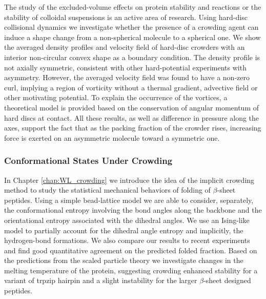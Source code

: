 The study of the excluded-volume effects on protein stability and reactions or the stability of colloidal suspensions is an active area of research. Using hard-disc collisional dynamics we investigate whether the presence of a crowding agent can induce a shape change from a non-spherical molecule to a spherical one. We show the averaged density profiles and velocity field of hard-disc crowders with an interior non-circular convex shape as a boundary condition. The density profile is not axially symmetric, consistent with other hard-potential experiments with asymmetry. However, the averaged velocity field was found to have a non-zero curl, implying a region of vorticity without a thermal gradient, advective field or other motivating potential. To explain the occurrence of the vortices, a theoretical model is provided based on the conservation of angular momentum of hard discs at contact. All these results, as well as difference in pressure along the axes, support the fact that as the packing fraction of the crowder rises, increasing force is exerted on an asymmetric molecule toward a symmetric one.

\subsubsection{Conformational States Under Crowding}
In Chapter \ref{chap:WL_crowding} we introduce the idea of the implicit crowding method to study the statistical mechanical behaviors of folding of $\beta$-sheet peptides. Using a simple bead-lattice model we are able to consider, separately, the conformational entropy involving the bond angles along the backbone and the orientational entropy associated with the dihedral angles. We use an Ising-like model to partially account for the dihedral angle entropy and implicitly, the hydrogen-bond formations. We also compare our results to recent experiments and find good quantitative agreement on the predicted folded fraction. Based on the predictions from the scaled particle theory we investigate changes in the melting temperature of the protein, suggesting crowding enhanced stability for a variant of trpzip hairpin and a slight instability for the larger $\beta$-sheet designed peptides.

